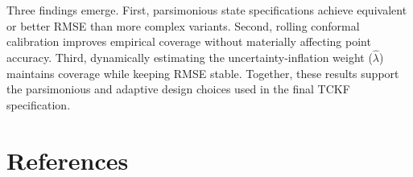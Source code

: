 \documentclass[
  authoryear,
  doubleblind,
  3p]{elsarticle}
\begin{document}
Three findings emerge. First, parsimonious state specifications achieve
equivalent or better RMSE than more complex variants. Second, rolling
conformal calibration improves empirical coverage without materially
affecting point accuracy. Third, dynamically estimating the
uncertainty-inflation weight (\(\hat{\lambda}\)) maintains coverage
while keeping RMSE stable. Together, these results support the
parsimonious and adaptive design choices used in the final TCKF
specification.

\pagebreak

\section*{References}\label{references}

\renewcommand{\bibsection}{}

\end{document}
